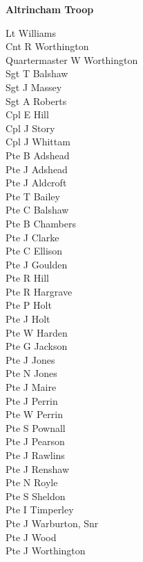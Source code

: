 \begin{center}
  \Large
  \textbf{Altrincham Troop}
\end{center}

\begin{multicols}{2}
  \noindent
  Lt Williams \\
  Cnt R Worthington \\
  Quartermaster W Worthington \\
  Sgt T Balshaw \\
  Sgt J Massey \\
  Sgt A Roberts \\
  Cpl E Hill \\
  Cpl J Story \\
  Cpl J Whittam \\
  Pte B Adshead \\
  Pte J Adshead \\
  Pte J Aldcroft \\
  Pte T Bailey \\
  Pte C Balshaw \\
  Pte B Chambers \\
  Pte J Clarke \\
  Pte C Ellison \\
  Pte J Goulden \\
  Pte R Hill \\
  Pte R Hargrave \\
  Pte P Holt \\
  Pte J Holt \\
  Pte W Harden \\
  Pte G Jackson \\
  Pte J Jones \\
  Pte N Jones \\
  Pte J Maire \\
  Pte J Perrin \\
  Pte W Perrin \\
  Pte S Pownall \\
  Pte J Pearson \\
  Pte J Rawlins \\
  Pte J Renshaw \\
  Pte N Royle \\
  Pte S Sheldon \\
  Pte I Timperley \\
  Pte J Warburton, Snr \\
  Pte J Wood \\
  Pte J Worthington \\
\end{multicols}


